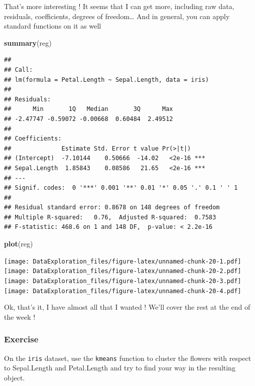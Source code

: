 \documentclass[
]{book}
\newenvironment{Shaded}{\begin{snugshade}}{\end{snugshade}}
\newcommand{\KeywordTok}[1]{\textcolor[rgb]{0.13,0.29,0.53}{\textbf{#1}}}
\newcommand{\NormalTok}[1]{#1}
\begin{document}
That's more interesting ! It seems that I can get more, including raw data, residuals, coefficients, degrees of freedom\ldots{}
And in general, you can apply standard functions on it as well

\begin{Shaded}
\begin{Highlighting}[]
\KeywordTok{summary}\NormalTok{(reg)}
\end{Highlighting}
\end{Shaded}

\begin{verbatim}
## 
## Call:
## lm(formula = Petal.Length ~ Sepal.Length, data = iris)
## 
## Residuals:
##      Min       1Q   Median       3Q      Max 
## -2.47747 -0.59072 -0.00668  0.60484  2.49512 
## 
## Coefficients:
##              Estimate Std. Error t value Pr(>|t|)    
## (Intercept)  -7.10144    0.50666  -14.02   <2e-16 ***
## Sepal.Length  1.85843    0.08586   21.65   <2e-16 ***
## ---
## Signif. codes:  0 '***' 0.001 '**' 0.01 '*' 0.05 '.' 0.1 ' ' 1
## 
## Residual standard error: 0.8678 on 148 degrees of freedom
## Multiple R-squared:   0.76,	Adjusted R-squared:  0.7583 
## F-statistic: 468.6 on 1 and 148 DF,  p-value: < 2.2e-16
\end{verbatim}

\begin{Shaded}
\begin{Highlighting}[]
\KeywordTok{plot}\NormalTok{(reg)}
\end{Highlighting}
\end{Shaded}

\texttt{[image: DataExploration\_files/figure-latex/unnamed-chunk-20-1.pdf]} \texttt{[image: DataExploration\_files/figure-latex/unnamed-chunk-20-2.pdf]} \texttt{[image: DataExploration\_files/figure-latex/unnamed-chunk-20-3.pdf]} \texttt{[image: DataExploration\_files/figure-latex/unnamed-chunk-20-4.pdf]}

Ok, that's it, I have almost all that I wanted ! We'll cover the rest at the end of the week !

\hypertarget{exercise}{%
\subsubsection{Exercise}\label{exercise}}

On the \texttt{iris} dataset, use the \texttt{kmeans} function to cluster the flowers with respect to Sepal.Length and Petal.Length and try to find your way in the resulting object.
\end{document}
